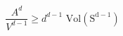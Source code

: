 \begin{equation}
\frac{A^d}{V^{d-1}} \ge d^{d-1}\,\,\mathrm{Vol(S^{d-1})} \label{bound}
\end{equation}

